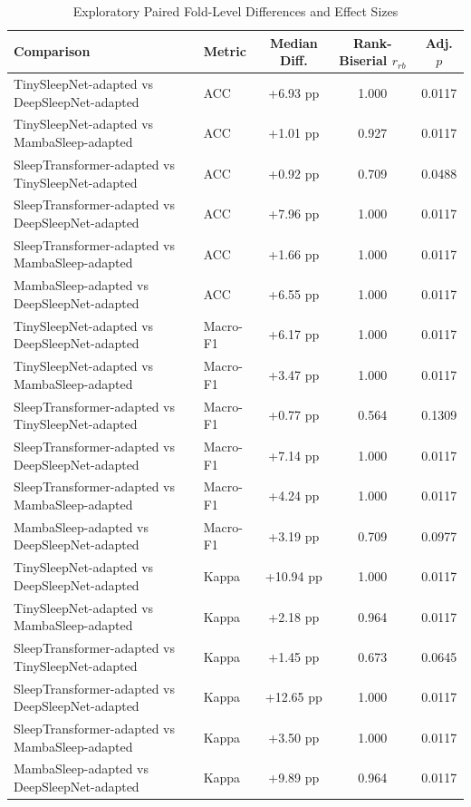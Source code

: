 \documentclass[conference]{IEEEtran}
\begin{document}
\begin{table}[t]
\centering
\caption{Exploratory Paired Fold-Level Differences and Effect Sizes}
\label{tab:effect_sizes}
\setlength{\tabcolsep}{6pt}
\begin{tabular}{llccc}
\toprule
Comparison & Metric & Median Diff. & Rank-Biserial $r_{rb}$ & Adj. $p$ \\
\midrule
TinySleepNet-adapted vs DeepSleepNet-adapted & ACC & +6.93 pp & 1.000 & 0.0117 \\
TinySleepNet-adapted vs MambaSleep-adapted & ACC & +1.01 pp & 0.927 & 0.0117 \\
SleepTransformer-adapted vs TinySleepNet-adapted & ACC & +0.92 pp & 0.709 & 0.0488 \\
SleepTransformer-adapted vs DeepSleepNet-adapted & ACC & +7.96 pp & 1.000 & 0.0117 \\
SleepTransformer-adapted vs MambaSleep-adapted & ACC & +1.66 pp & 1.000 & 0.0117 \\
MambaSleep-adapted vs DeepSleepNet-adapted & ACC & +6.55 pp & 1.000 & 0.0117 \\
\midrule
TinySleepNet-adapted vs DeepSleepNet-adapted & Macro-F1 & +6.17 pp & 1.000 & 0.0117 \\
TinySleepNet-adapted vs MambaSleep-adapted & Macro-F1 & +3.47 pp & 1.000 & 0.0117 \\
SleepTransformer-adapted vs TinySleepNet-adapted & Macro-F1 & +0.77 pp & 0.564 & 0.1309 \\
SleepTransformer-adapted vs DeepSleepNet-adapted & Macro-F1 & +7.14 pp & 1.000 & 0.0117 \\
SleepTransformer-adapted vs MambaSleep-adapted & Macro-F1 & +4.24 pp & 1.000 & 0.0117 \\
MambaSleep-adapted vs DeepSleepNet-adapted & Macro-F1 & +3.19 pp & 0.709 & 0.0977 \\
\midrule
TinySleepNet-adapted vs DeepSleepNet-adapted & Kappa & +10.94 pp & 1.000 & 0.0117 \\
TinySleepNet-adapted vs MambaSleep-adapted & Kappa & +2.18 pp & 0.964 & 0.0117 \\
SleepTransformer-adapted vs TinySleepNet-adapted & Kappa & +1.45 pp & 0.673 & 0.0645 \\
SleepTransformer-adapted vs DeepSleepNet-adapted & Kappa & +12.65 pp & 1.000 & 0.0117 \\
SleepTransformer-adapted vs MambaSleep-adapted & Kappa & +3.50 pp & 1.000 & 0.0117 \\
MambaSleep-adapted vs DeepSleepNet-adapted & Kappa & +9.89 pp & 0.964 & 0.0117 \\
\bottomrule
\end{tabular}
\end{table}
\end{document}
